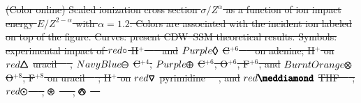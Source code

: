 \documentclass[10pt,showpacs,showkeys,twocolumn]{revtex4-1} %
\providecommand{\DIFdel}[1]{{\protect\color{red}\sout{#1}}}                      %
\providecommand{\DIFdelbegin}{} %
\providecommand{\DIFdelFL}[1]{\DIFdel{#1}} %
\newcommand{\DIFscaledelfig}{0.5}
\newlength{\DIFdelgraphicswidth} %
\newlength{\DIFdelgraphicsheight} %
\newcommand{\DIFdelincludegraphics}[2][]{%
\sbox{\DIFdelgraphicsbox}{\DIFOincludegraphics[#1]{#2}}%
\settoboxwidth{\DIFdelgraphicswidth}{\DIFdelgraphicsbox} %
\settoboxtotalheight{\DIFdelgraphicsheight}{\DIFdelgraphicsbox} %
\scalebox{\DIFscaledelfig}{%
\parbox[b]{\DIFdelgraphicswidth}{\usebox{\DIFdelgraphicsbox}\\[-\baselineskip] \rule{\DIFdelgraphicswidth}{0em}}\llap{\resizebox{\DIFdelgraphicswidth}{\DIFdelgraphicsheight}{%
\setlength{\unitlength}{\DIFdelgraphicswidth}%
\begin{picture}(1,1)%
\thicklines\linethickness{2pt} %
{\color[rgb]{1,0,0}\put(0,0){\framebox(1,1){}}}%
{\color[rgb]{1,0,0}\put(0,0){\line( 1,1){1}}}%
{\color[rgb]{1,0,0}\put(0,1){\line(1,-1){1}}}%
\end{picture}%
}\hspace*{3pt}}} %
} %
\DeclareRobustCommand{\DIFdelbegin}{\DIFOdelbegin \let\includegraphics\DIFdelincludegraphics} %
\begin{document}
\DIFdelbegin %
{%
\DIFdelFL{(Color online) Scaled ionization cross section $\sigma/Z^{\alpha}$ as a function of ion impact energy $E/Z^{2-\alpha}$ with $\alpha=1.2$. Colors are associated with the incident ion labeled on top of the figure. Curves: present CDW--SSM theoretical results. Symbols: experimental impact of 
\mbox{\LARGE$\color{red}\circ$} H$^+$~\mbox{%
\cite{iriki2011} }\hspace{0pt}%
and
}%
\DIFdelFL{$\color{Purple}\pmb{\lozenge}$}%
\DIFdelFL{C$^{+6}$ \mbox{%
\cite{tribedi2019} }\hspace{0pt}%
on adenine;
H$^+$ on }%
\DIFdelFL{$\color{red}\pmb{\triangle}$}%
\DIFdelFL{uracil~\mbox{%
\cite{itoh2013}}\hspace{0pt}%
, 
}%
\DIFdelFL{$\color{NavyBlue}\pmb{\ominus}$}%
\DIFdelFL{C$^{+4}$, 
}%
\DIFdelFL{$\color{Purple}\pmb{\oplus}$}%
\DIFdelFL{C$^{+6}$, O$^{+6}$, F$^{+6}$, and 
}%
\DIFdelFL{$\color{BurntOrange}\pmb{\otimes}$}%
\DIFdelFL{O$^{+8}$, F$^{+8}$ on uracil~\mbox{%
\cite{agnihotri2012,agnihotri2013}}\hspace{0pt}%
;
H$^+$ on }%
\DIFdelFL{$\color{red}\pmb{\triangledown}$}%
\DIFdelFL{pyrimidine~\mbox{%
\cite{wolff2014}}\hspace{0pt}%
, and
}%
\DIFdelFL{$\color{red}\pmb{\meddiamond}$}%
\DIFdelFL{THF~\mbox{%
\cite{wang2016}}\hspace{0pt}%
;
\mbox{\fontsize{11}{20}$\color{red}\pmb{\odot}$}~\mbox{%
\cite{Luna2007}}\hspace{0pt}%
, 
}%
\DIFdelFL{$\pmb{\logof}$}%
\DIFdelFL{~\mbox{%
\cite{Rudd86}}\hspace{0pt}%
, 
}%
\DIFdelFL{$\pmb{\varowedge}$}%
\DIFdelFL{~\mbox{%
\cite{pRudd85}}\hspace{0pt}%
}}
\end{document}
